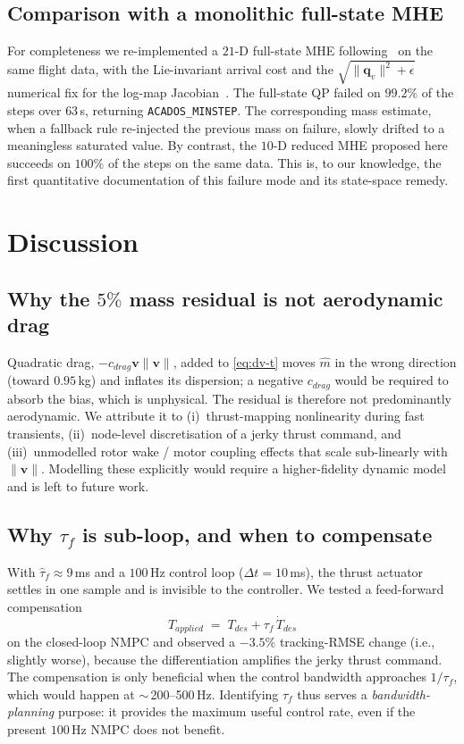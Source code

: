 \documentclass[lettersize,journal]{IEEEtran}
\newcommand{\vect}[1]{\bm{#1}}
\newcommand{\dt}{\Delta t}
\begin{document}
\subsection{Comparison with a monolithic full-state MHE}
For completeness we re-implemented a $21$-D full-state MHE
following~\cite{liu2023nonlinear} on the same flight data, with
the Lie-invariant arrival cost and the
$\sqrt{\|\vect q_v\|^2+\epsilon}$ numerical fix for the log-map
Jacobian~\cite{forster2015imu}.  The full-state QP failed on
$99.2\%$ of the steps over $63$\,s, returning
\texttt{ACADOS\_MINSTEP}.  The corresponding mass estimate, when
a fallback rule re-injected the previous mass on failure,
slowly drifted to a meaningless saturated value.  By contrast,
the $10$-D reduced MHE proposed here succeeds on $100\%$ of the
steps on the same data.  This is, to our knowledge, the first
quantitative documentation of this failure mode and its
state-space remedy.

\section{Discussion}\label{sec:discussion}

\subsection{Why the $5\%$ mass residual is not aerodynamic drag}
Quadratic drag, $-c_{drag}\vect v\|\vect v\|$, added to
\eqref{eq:dv-t} moves $\hat m$ in the wrong direction (toward
$0.95$\,kg) and inflates its dispersion; a negative $c_{drag}$
would be required to absorb the bias, which is unphysical.  The
residual is therefore not predominantly aerodynamic.  We
attribute it to (i)~thrust-mapping nonlinearity during fast
transients, (ii)~node-level discretisation of a jerky thrust
command, and (iii)~unmodelled rotor wake / motor coupling
effects that scale sub-linearly with~$\|\vect v\|$.  Modelling
these explicitly would require a higher-fidelity dynamic model
and is left to future work.

\subsection{Why $\tau_f$ is sub-loop, and when to compensate}
With $\hat\tau_f\approx 9$\,ms and a $100$\,Hz control loop
($\dt=10$\,ms), the thrust actuator settles in one sample and is
invisible to the controller.  We tested a feed-forward
compensation
\[
T_{applied} \;=\; T_{des} + \tau_f\,\dot T_{des}
\]
on the closed-loop NMPC and observed a $-3.5\%$ tracking-RMSE
change (i.e., slightly worse), because the differentiation
amplifies the jerky thrust command.  The compensation is only
beneficial when the control bandwidth approaches $1/\tau_f$,
which would happen at $\sim$\,200--500\,Hz.  Identifying $\tau_f$
thus serves a \emph{bandwidth-planning} purpose: it provides the
maximum useful control rate, even if the present $100$\,Hz NMPC
does not benefit.
\end{document}
